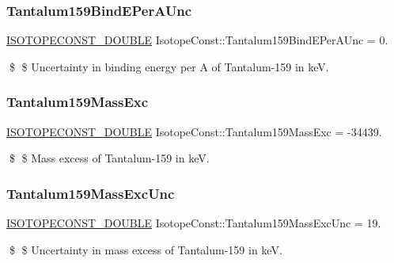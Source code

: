 \subsubsection{\texorpdfstring{Tantalum159\+Bind\+E\+Per\+A\+Unc}{Tantalum159BindEPerAUnc}}
{\footnotesize\ttfamily \mbox{\hyperlink{group___isotope_const-_macros_ga8f45a7272ce02c0b4c65c44636ed719a}{I\+S\+O\+T\+O\+P\+E\+C\+O\+N\+S\+T\+\_\+\+D\+O\+U\+B\+LE}} Isotope\+Const\+::\+Tantalum159\+Bind\+E\+Per\+A\+Unc = 0.}

\$ \$ Uncertainty in binding energy per A of Tantalum-\/159 in keV. \mbox{\label{group___isotope_const-_tantalum-_ta159_ga2e00a590d7e395e01e698fd0f7bf5f98}} 
\subsubsection{\texorpdfstring{Tantalum159\+Mass\+Exc}{Tantalum159MassExc}}
{\footnotesize\ttfamily \mbox{\hyperlink{group___isotope_const-_macros_ga8f45a7272ce02c0b4c65c44636ed719a}{I\+S\+O\+T\+O\+P\+E\+C\+O\+N\+S\+T\+\_\+\+D\+O\+U\+B\+LE}} Isotope\+Const\+::\+Tantalum159\+Mass\+Exc = -\/34439.}

\$ \$ Mass excess of Tantalum-\/159 in keV. \mbox{\label{group___isotope_const-_tantalum-_ta159_ga8322c9f35eb5727c75770675a2461e11}} 
\subsubsection{\texorpdfstring{Tantalum159\+Mass\+Exc\+Unc}{Tantalum159MassExcUnc}}
{\footnotesize\ttfamily \mbox{\hyperlink{group___isotope_const-_macros_ga8f45a7272ce02c0b4c65c44636ed719a}{I\+S\+O\+T\+O\+P\+E\+C\+O\+N\+S\+T\+\_\+\+D\+O\+U\+B\+LE}} Isotope\+Const\+::\+Tantalum159\+Mass\+Exc\+Unc = 19.}

\$ \$ Uncertainty in mass excess of Tantalum-\/159 in keV. \mbox{\label{group___isotope_const-_tantalum-_ta159_gacaa7ca11092bc2a49b681ad2526bd706}} 
